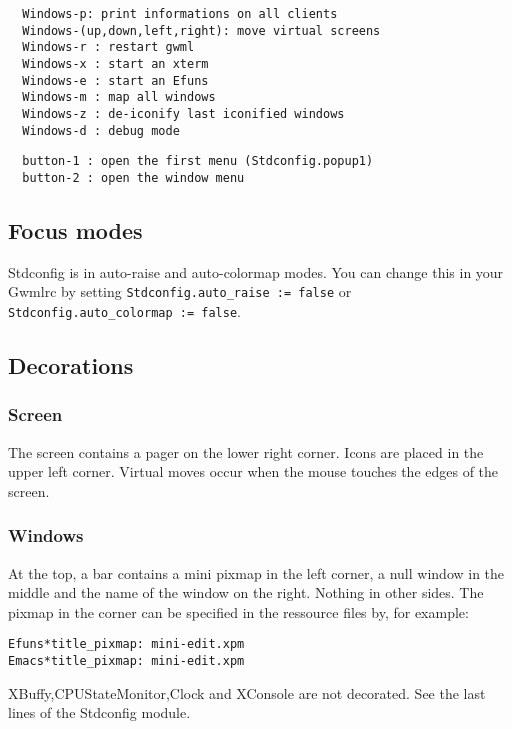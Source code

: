 \documentclass{book}
\begin{document}
\begin{verbatim}
  Windows-p: print informations on all clients
  Windows-(up,down,left,right): move virtual screens
  Windows-r : restart gwml
  Windows-x : start an xterm
  Windows-e : start an Efuns
  Windows-m : map all windows
  Windows-z : de-iconify last iconified windows
  Windows-d : debug mode
\end{verbatim}

\begin{verbatim}
  button-1 : open the first menu (Stdconfig.popup1)
  button-2 : open the window menu
\end{verbatim}
  
\subsection{Focus modes}  

   Stdconfig is in auto-raise and auto-colormap modes. You can change this in
  your Gwmlrc by setting {\tt Stdconfig.auto\_raise := false} or\\
  {\tt Stdconfig.auto\_colormap := false}.
  
\subsection{Decorations}
  
\subsubsection{Screen}
  
  The screen contains a pager on the lower right corner. Icons are placed in
the upper left corner. Virtual moves occur when the mouse touches the 
edges of the screen.

\subsubsection{Windows}
  
At the top, a bar contains a mini pixmap in the left corner, a null window 
in the middle and the name of the window on the right. Nothing in other sides.
The pixmap in the corner can be specified in the ressource files by, for
example:

\begin{verbatim}
Efuns*title_pixmap: mini-edit.xpm
Emacs*title_pixmap: mini-edit.xpm
\end{verbatim}

XBuffy,CPUStateMonitor,Clock and XConsole are not decorated. See the last 
lines of the Stdconfig module.
\end{document}
